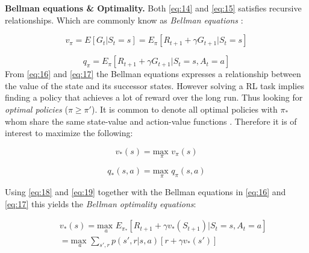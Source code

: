 \documentclass{kththesis}
\theoremstyle{definition}
\begin{document}
\textbf{Bellman equations \& Optimality.} Both \autoref{eq:14} and \autoref{eq:15} satisfies recursive relationships. Which are commonly know as \textit{Bellman equations} \parencite{sutton1998reinforcement}:

\begin{equation}
    \label{eq:16}
    v_{\pi} = E[G_t | S_t = s] = E_{\pi}[R_{t+1} + \gamma G_{t+1} | S_t = s]
\end{equation}

\begin{equation}
    \label{eq:17}
    q_{\pi} = E_{\pi}[R_{t+1} + \gamma G_{t+1} | S_t = s,  A_t = a]
\end{equation}
From \autoref{eq:16} and \autoref{eq:17} the Bellman equations expresses a relationship between the value of the state and its successor states. However solving a RL task implies finding a policy that achieves a lot of reward over the long run. Thus looking for \textit{optimal policies} ($\pi \geq \pi'$). It is common to denote all optimal policies with $\pi_{*}$ whom share the same state-value and action-value functions \parencite{sutton1998reinforcement}. Therefore it is of interest to maximize the following:

\begin{equation}
    \label{eq:18}
    v_{*}(s) = \underset{\pi}{\text{max }} v_{\pi}(s)
\end{equation}

\begin{equation}
    \label{eq:19}
    q_{*}(s,a) = \underset{\pi}{\text{max }} q_{\pi}(s,a)
\end{equation}

Using \autoref{eq:18} and \autoref{eq:19} together with the Bellman equations in \autoref{eq:16} and \autoref{eq:17} this yields the \textit{Bellman optimality equations}:

\begin{equation}
\label{eq:20}
\begin{aligned}
& & v_{*}(s) =  \underset{a}{\text{max }} 
E_{\pi_{*}}[R_{t+1} + \gamma v_{*}(S_{t+1}) | S_t =s, A_t = a] \\
& & = \underset{a}{\text{max }} 
\sum_{s', r}^{}{p(s', r | s,a)}[r + \gamma v_{*}(s')]
\end{aligned}
\end{equation}
\end{document}
